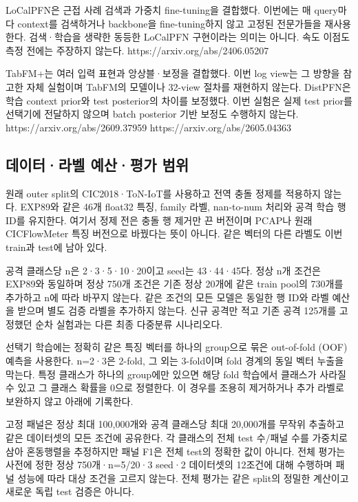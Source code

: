 LoCalPFN은 근접 사례 검색과 가중치 fine-tuning을 결합했다. 이번에는 매 query마다 context를 검색하거나 backbone을 fine-tuning하지 않고 고정된 전문가들을 재사용한다. 검색·학습을 생략한 동등한 LoCalPFN 구현이라는 의미는 아니다. 속도 이점도 측정 전에는 주장하지 않는다. https:/\allowbreak{}/\allowbreak{}arxiv.org/\allowbreak{}abs/\allowbreak{}2406.05207

TabFM+\allowbreak{}는 여러 입력 표현과 앙상블·보정을 결합했다. 이번 log view는 그 방향을 참고한 자체 실험이며 TabFM의 모델이나 32-view 절차를 재현하지 않는다. DistPFN은 학습 context prior와 test posterior의 차이를 보정했다. 이번 실험은 실제 test prior를 선택기에 전달하지 않으며 batch posterior 기반 보정도 수행하지 않는다. https:/\allowbreak{}/\allowbreak{}arxiv.org/\allowbreak{}abs/\allowbreak{}2609.37959 https:/\allowbreak{}/\allowbreak{}arxiv.org/\allowbreak{}abs/\allowbreak{}2605.04363

\subsection{데이터·라벨 예산·평가 범위}
원래 outer split의 CIC2018·ToN-IoT를 사용하고 전역 충돌 정제를 적용하지 않는다. EXP89와 같은 46개 float32 특징, family 라벨, nan-to-num 처리와 공격 학습 행 ID를 유지한다. 여기서 정제 전은 충돌 행 제거만 끈 버전이며 PCAP나 원래 CICFlowMeter 특징 버전으로 바꿨다는 뜻이 아니다. 같은 벡터의 다른 라벨도 이번 train과 test에 남아 있다.

공격 클래스당 n은 2·3·5·10·20이고 seed는 43·44·45다. 정상 n개 조건은 EXP89와 동일하며 정상 750개 조건은 기존 정상 20개에 같은 train pool의 730개를 추가하고 n에 따라 바꾸지 않는다. 같은 조건의 모든 모델은 동일한 행 ID와 라벨 예산을 받으며 별도 검증 라벨을 추가하지 않는다. 신규 공격만 적고 기존 공격 125개를 고정했던 순차 실험과는 다른 최종 다중분류 시나리오다.

선택기 학습에는 정확히 같은 특징 벡터를 하나의 group으로 묶은 out-of-fold (OOF) 예측을 사용한다. n=\allowbreak{}2·3은 2-fold, 그 외는 3-fold이며 fold 경계의 동일 벡터 누출을 막는다. 특정 클래스가 하나의 group에만 있으면 해당 fold 학습에서 클래스가 사라질 수 있고 그 클래스 확률을 0으로 정렬한다. 이 경우를 조용히 제거하거나 추가 라벨로 보완하지 않고 아래에 기록한다.

고정 패널은 정상 최대 100,000개와 공격 클래스당 최대 20,000개를 무작위 추출하고 같은 데이터셋의 모든 조건에 공유한다. 각 클래스의 전체 test 수/\allowbreak{}패널 수를 가중치로 삼아 혼동행렬을 추정하지만 패널 F1은 전체 test의 정확한 값이 아니다. 전체 평가는 사전에 정한 정상 750개·n=\allowbreak{}5/\allowbreak{}20·3 seed·2 데이터셋의 12조건에 대해 수행하며 패널 성능에 따라 대상 조건을 고르지 않는다. 전체 평가는 같은 split의 정밀한 계산이고 새로운 독립 test 검증은 아니다.

